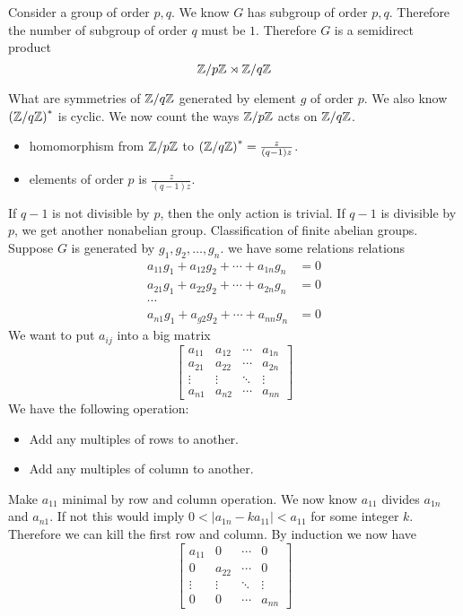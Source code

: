 \begin{example}
	Consider a group of order $p,q$. We know $G$ has subgroup of order $p,q$. Therefore the number of subgroup of order $q$ must be $1$. Therefore $G$ is a semidirect product
	\[ \mathbb Z/ p \mathbb Z \rtimes \mathbb Z/ q \mathbb Z \]
\end{example}
What are symmetries of $\mathbb Z/ q \mathbb Z $
generated by element $g$ of order $p$. We also know $\left( \mathbb Z/ q \mathbb Z \right)^*$ is cyclic. We now count the ways $\mathbb Z/ p \mathbb Z $ acts on $\mathbb Z/ q \mathbb Z $.
\begin{itemize}
	\item homomorphism from $\mathbb Z/ p \mathbb Z$ to $\left( \mathbb Z/ q \mathbb Z  \right)^* = \frac{z}{(q-1)z}$.
	\item elements of order $p$ is $\frac{z}{(q-1)z}$.
\end{itemize}
If $q - 1$ is not divisible by $p$, then the only action is trivial. If $q - 1$ is divisible by $p$, we get another nonabelian group.
Classification of finite abelian groups. Suppose $G$ is generated by $g_1, g_2, \ldots, g_n$. we have some relations relations 
\begin{align*}
    a_{11} g_1 + a_{12} g_2 + \cdots + a_{1n} g_n &= 0 \\
    a_{21} g_1 + a_{22} g_2 + \cdots + a_{2n} g_n &= 0 \\
    \cdots \\
    a_{n1} g_1 + a_{g2} g_2 + \cdots + a_{nn} g_n &= 0
\end{align*}
We want to put $a_{ij}$ into a big matrix
\[ \begin{bmatrix}
	a_{11} & a_{12} & \cdots & a_{1n} \\
	a_{21} & a_{22} & \cdots & a_{2n} \\
	\vdots & \vdots & \ddots & \vdots \\
	a_{n1} & a_{n2} & \cdots & a_{nn}
\end{bmatrix} \]
We have the following operation:
\begin{itemize}
	\item Add any multiples of rows to another. 
	\item Add any multiples of column to another.
\end{itemize}
Make $a_{11}$ minimal by row and column operation. We now know $a_{11}$ divides $a_{1n}$ and $a_{n1}$. If not this would imply $0 < |a_{1n} - ka_{11}| < a_{11}$ for some integer $k$. Therefore we can kill the first row and column. By induction we now have
\[ \begin{bmatrix}
	a_{11} & 0 & \cdots & 0 \\
	0 & a_{22} & \cdots & 0 \\
	\vdots & \vdots & \ddots & \vdots \\
	0 & 0 & \cdots & a_{nn}
\end{bmatrix} \]


